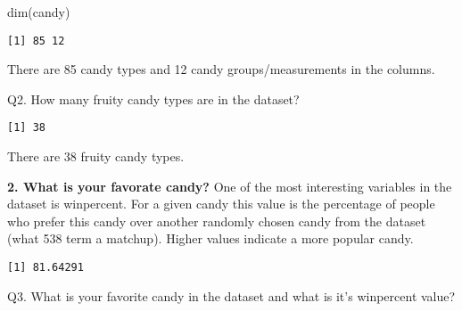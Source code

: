 \documentclass[
  letterpaper,
  DIV=11,
  numbers=noendperiod]{scrartcl}
\newenvironment{Shaded}{\begin{snugshade}}{\end{snugshade}}
\newcommand{\FunctionTok}[1]{\textcolor[rgb]{0.28,0.35,0.67}{#1}}
\newcommand{\NormalTok}[1]{\textcolor[rgb]{0.00,0.23,0.31}{#1}}
\newcommand{\SpecialCharTok}[1]{\textcolor[rgb]{0.37,0.37,0.37}{#1}}
\newcommand{\StringTok}[1]{\textcolor[rgb]{0.13,0.47,0.30}{#1}}
\begin{document}
\begin{Shaded}
\begin{Highlighting}[]
\FunctionTok{dim}\NormalTok{(candy)}
\end{Highlighting}
\end{Shaded}

\begin{verbatim}
[1] 85 12
\end{verbatim}

There are 85 candy types and 12 candy groups/measurements in the
columns.

Q2. How many fruity candy types are in the dataset?

\begin{Shaded}
\end{Shaded}

\begin{verbatim}
[1] 38
\end{verbatim}

There are 38 fruity candy types.

\textbf{2. What is your favorate candy?} One of the most interesting
variables in the dataset is winpercent. For a given candy this value is
the percentage of people who prefer this candy over another randomly
chosen candy from the dataset (what 538 term a matchup). Higher values
indicate a more popular candy.

\begin{Shaded}
\end{Shaded}

\begin{verbatim}
[1] 81.64291
\end{verbatim}

Q3. What is your favorite candy in the dataset and what is it's
winpercent value?

\begin{Shaded}
\end{Shaded}
\end{document}
